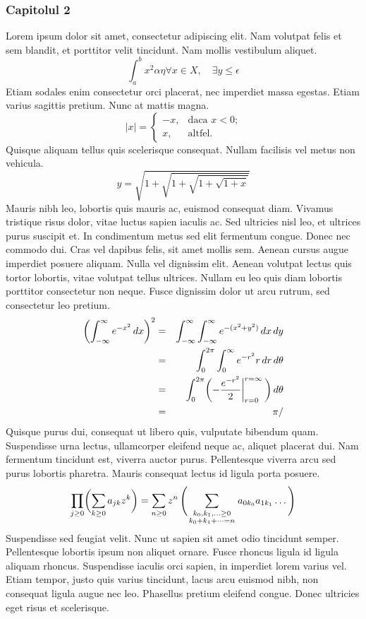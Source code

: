 \begin{frame}
\frametitle{Capitolul 2} 
Lorem ipsum dolor sit amet, consectetur adipiscing elit. Nam volutpat felis et sem blandit, et porttitor velit tincidunt. Nam mollis vestibulum aliquet. 
\begin{equation}
\int_a^b x^2 \alpha \eta \forall x \in X, \quad \exists y \leq \epsilon
\end{equation}
Etiam sodales enim consectetur orci placerat, nec imperdiet massa egestas. Etiam varius sagittis pretium. Nunc at mattis magna.
$$|x| = \left\{\begin{array}{rl} -x, & \textrm{daca $x<0$;}\\ x, & \textrm{altfel.} \end{array} \right. $$
Quisque aliquam tellus quis scelerisque consequat. Nullam facilisis vel metus non vehicula.
$$y = \sqrt{1+\sqrt{1+\sqrt{1+ \sqrt{1+x}}}}$$
Mauris nibh leo, lobortis quis mauris ac, euismod consequat diam. Vivamus tristique risus dolor, vitae luctus sapien iaculis ac. Sed ultricies nisl leo, et ultrices purus suscipit et. In condimentum metus sed elit fermentum congue. Donec nec commodo dui. Cras vel dapibus felis, sit amet mollis sem. Aenean cursus augue imperdiet posuere aliquam. 
Nulla vel dignissim elit. Aenean volutpat lectus quis tortor lobortis, vitae volutpat tellus ultrices. Nullam eu leo quis diam lobortis porttitor consectetur non neque. Fusce dignissim dolor ut arcu rutrum, sed consectetur leo pretium.
\begin{eqnarray}
\biggl(\int_{-\infty} ^\infty e^{-x^2}\,dx\biggr)^2 & =& \int_{-\infty}^\infty \int_{-\infty}^\infty e^{-(x^2+y^2)}\,dx\,dy \nonumber \\ & =& \int_0^{2\pi}\int_0^\infty e^{-r^2}r\,dr\,d\theta \nonumber \\ & =& \int_0^{2\pi}\biggl(-{e^{-r^2}\over2} \bigg|_{r=0}^{r=\infty}\,\biggr)\,d\theta \nonumber \\ & =& \pi /\end{eqnarray}
 Quisque purus dui, consequat ut libero quis, vulputate bibendum quam. Suspendisse urna lectus, ullamcorper eleifend neque ac, aliquet placerat dui. Nam fermentum tincidunt est, viverra auctor purus. Pellentesque viverra arcu sed purus lobortis pharetra. Mauris consequat lectus id ligula porta posuere.
$$ \prod_{j\ge0}\biggl( \sum_{k\ge0}a_{jk}z^k\biggr) =\sum_{n\ge0}z^n\,\Biggl(\sum_ {\scriptstyle k_0,k_1, \ldots\ge0\atop \scriptstyle k_0+k_1+\cdots=n} a_{0k_0}a_{1k_1}\ldots\,\Biggr) $$
Suspendisse sed feugiat velit. Nunc ut sapien sit amet odio tincidunt semper. Pellentesque lobortis ipsum non aliquet ornare. Fusce rhoncus ligula id ligula aliquam rhoncus. Suspendisse iaculis orci sapien, in imperdiet lorem varius vel. Etiam tempor, justo quis varius tincidunt, lacus arcu euismod nibh, non consequat ligula augue nec leo. Phasellus pretium eleifend congue. Donec ultricies eget risus et scelerisque.

\end{frame}
